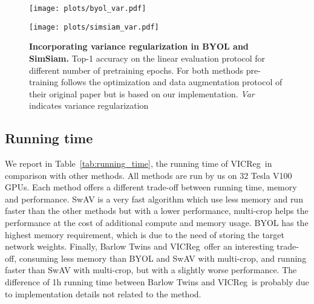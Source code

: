 \documentclass{article}
\newcommand{\algo}{VICReg}
\begin{document}
\begin{figure}
\hspace{-4em}
    \centering
    \begin{minipage}{0.38\textwidth}
        \centering
        \texttt{[image: plots/byol\_var.pdf]}
\end{minipage}\hspace{5em}
    \begin{minipage}{0.42\textwidth}
        \centering
        \texttt{[image: plots/simsiam\_var.pdf]}
    \end{minipage}
    \caption{\textbf{Incorporating variance regularization in BYOL and SimSiam.} Top-1 accuracy on the linear evaluation protocol for different number of pretraining epochs. For both methods pre-training follows the optimization and data augmentation protocol of their original paper but is based on our implementation. \textit{Var} indicates variance regularization}
    \label{fig:byol_simsiam_accuracy}
\end{figure}


\subsection{Running time} \label{app:running_time}

We report in Table~\ref{tab:running_time}, the running time of \algo \ in comparison with other methods. All methods are run by us on 32 Tesla V100 GPUs. Each method offers a different trade-off between running time, memory and performance. SwAV is a very fast algorithm which use less memory and run faster than the other methods but with a lower performance, multi-crop helps the performance at the cost of additional compute and memory usage. BYOL has the highest memory requirement, which is due to the need of storing the target network weights. Finally, Barlow Twins and \algo \ offer an interesting trade-off, consuming less memory than BYOL and SwAV with multi-crop, and running faster than SwAV with multi-crop, but with a slightly worse performance. The difference of 1h running time between Barlow Twins and \algo \ is probably due to implementation details not related to the method.

\vspace{6mm}
\end{document}
